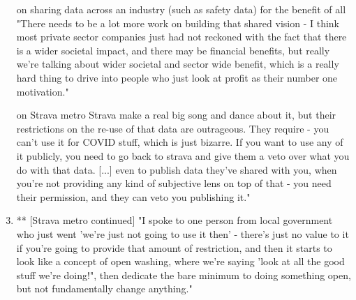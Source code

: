 \begin{enumerate}
\item [on sharing data across an industry (such as safety data) for the benefit of all] "There needs to be a lot more work on building that shared vision - I think most private sector companies just had not reckoned with the fact that there is a wider societal impact, and there may be financial benefits, but really we're talking about wider societal and sector wide benefit, which is a really hard thing to drive into people who just look at profit as their number one motivation."
\item [on Strava metro] Strava make a real big song and dance about it, but their restrictions on the re-use of that data are outrageous. They require - you can't use it for COVID stuff, which is just bizarre. If you want to use any of it publicly, you need to go back to strava and give them a veto over what you do with that data. [...] even to publish data they've shared with you, when you're not providing any kind of subjective lens on top of that - you need their permission, and they can veto you publishing it."
\item ** [Strava metro continued] "I spoke to one person from local government who just went 'we're just not going to use it then' - there's just no value to it if you're going to provide that amount of restriction, and then it starts to look like a concept of open washing, where we're saying 'look at all the good stuff we're doing!", then dedicate the bare minimum to doing something open, but not fundamentally change anything."
\end{enumerate}